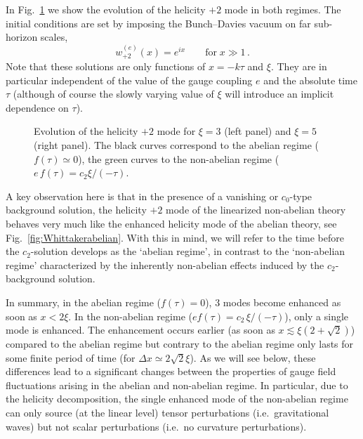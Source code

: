 In Fig.~\ref{fig:TensorModeEvolution} we show the evolution of the helicity $+2$ mode in both regimes. The initial conditions are set by imposing the Bunch--Davies vacuum on far sub-horizon scales,
\begin{equation}
 w_{+2}^{(e)}(x) =   e^{i x} \qquad \text{for} \; x \gg 1 \,. \label{eq:BDsimple}
\end{equation}
Note that these solutions are only functions of $x = - k \tau$ and $\xi$. They are in particular independent of the value of the gauge coupling $e$ and the absolute time $\tau$ (although of course the slowly varying value of $\xi$ will introduce an implicit dependence on $\tau$).

\begin{figure}
\hfill
{}
\caption{Evolution of the helicity $+2$ mode for $\xi = 3$ (left panel) and $\xi = 5$ (right panel). The black curves correspond to the abelian regime ($f(\tau) \simeq 0$), the green curves to the non-abelian regime ($e \, f(\tau) = c_2 \xi /(- \tau)$. }
  \label{fig:TensorModeEvolution}
\end{figure}

{A key observation here is that in the presence of a vanishing or $c_0$-type background solution, the helicity $+2$ mode of the linearized non-abelian theory behaves very much like the enhanced helicity mode of the abelian theory, see Fig.~\ref{fig:Whittakerabelian}. With this in mind, we will refer to the time before the $c_2$-solution develops as the `abelian regime', in contrast to the `non-abelian regime' characterized by the inherently non-abelian effects induced by the  $c_2$-background solution.}


In summary, in the abelian regime ($f(\tau) = 0$), 3 modes become enhanced as soon as $x < 2 \xi$. In the non-abelian regime ($e f(\tau) = c_2 \, \xi/(- \tau)$), only a single mode is enhanced. The enhancement occurs earlier (as soon as $x \lesssim \xi(2 + \sqrt{2})$) compared to the abelian regime  but contrary to the abelian regime only lasts for some finite period of time (for $\Delta x \simeq 2  \sqrt{2} \xi $). As we will see below, these differences lead to a significant changes between the properties of gauge field fluctuations arising in the abelian and non-abelian regime. 
In particular, due to the helicity decomposition, the single enhanced mode of the non-abelian regime can only source (at the linear level) tensor perturbations (i.e.\ gravitational waves) but not scalar perturbations (i.e.\ no curvature perturbations). 

